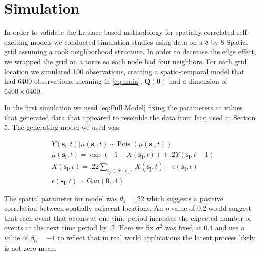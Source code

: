 \documentclass[11pt]{isuthesis}
\begin{document}
\section{Simulation}

In order to validate the Laplace based methodology for spatially correlated self-exciting models we conducted simulation studies using data on a 8 by 8 Spatial grid assuming a rook neighborhood structure.  In order to decrease the edge effect, we wrapped the grid on a torus so each node had four neighbors.  For each grid location we simulated 100 observations, creating a spatio-temporal model that had 6400 observations, meaning in \eqref{eq:main}, $\boldsymbol{Q}(\boldsymbol{\theta})$ had a dimension of $6400 \times 6400$.

In the first simulation we used \eqref{eq:Full Model} fixing the parameters at values that generated data that appeared to resemble the data from Iraq used in Section 5.  The generating model we used was:

\begin{align}
& Y(\boldsymbol{s_i},t)|\mu(\boldsymbol{s_i},t) \sim \text{Pois }(\mu(\boldsymbol{s_i},t)) \label{eq:First Simulation}\\
& \mu(\boldsymbol{s_i},t) = \exp(-1+X(\boldsymbol{s_i},t)) + .2 Y(\boldsymbol{s_i},t-1) \nonumber \\
& X(\boldsymbol{s_i},t) = .22 \sum_{\boldsymbol{s_j}\in N(\boldsymbol{s_i})}X(\boldsymbol{s_j},t) + \epsilon(\boldsymbol{s_i},t) \nonumber\\
&\epsilon(\boldsymbol{s_i},t) \sim \mbox{Gau}(0,.4) \nonumber
\end{align}

The spatial parameter for model was $\theta_1=.22$ which suggests a positive correlation between spatially adjacent locations.  An $\eta$ value of 0.2 would suggest that each event that occurs at one time period increases the expected number of events at the next time period by .2.  Here we fix $\sigma^2$ was fixed at 0.4 and use a value of $\beta_0=-1$  to reflect that in real world applications the latent process likely is not zero mean.
\end{document}
